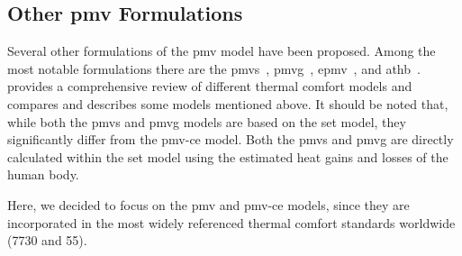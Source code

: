 \subsection{Other \ac{pmv} Formulations}\label{subsec:other-pmv-formulations}
Several other formulations of the \ac{pmv} model have been proposed.
Among the most notable formulations there are the \ac{pmvs}~\cite{GaggeSET}, \ac{pmvg}~\cite{GaggeSET},  \ac{epmv}~\cite{Toftum2002}, and \ac{athb}~\cite{Schweiker2022}.
 provides a comprehensive review of different thermal comfort models and compares and describes some models mentioned above.
It should be noted that, while both the \ac{pmvs} and \ac{pmvg} models are based on the \ac{set} model, they significantly differ from the \ac{pmv-ce} model.
Both the \ac{pmvs} and \ac{pmvg} are directly calculated within the \ac{set} model using the estimated heat gains and losses of the human body.

Here, we decided to focus on the \ac{pmv} and \ac{pmv-ce} models, since they are incorporated in the most widely referenced thermal comfort standards worldwide (\gls{7730} and \gls{55}).

